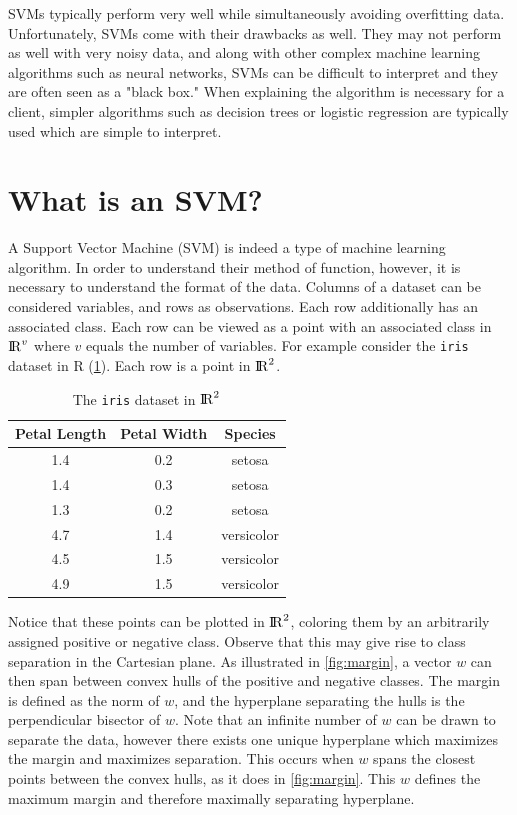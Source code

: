\documentclass[11pt]{article}
\theoremstyle{remark}	  \newtheorem*{remark}{Remark}
\numberwithin{equation}{section}
\begin{document}
SVMs typically perform very well while simultaneously avoiding overfitting data. Unfortunately, SVMs come with their drawbacks as well. They may not perform as well with very noisy data, and along with other complex machine learning algorithms such as neural networks, SVMs can be difficult to interpret and they are often seen as a "black box." When explaining the algorithm is necessary for a client, simpler algorithms such as decision trees or logistic regression are typically used which are simple to interpret.

\section{What is an SVM?}

A Support Vector Machine (SVM) is indeed a type of machine learning algorithm. In order to understand their method of function, however, it is necessary to understand the format of the data. Columns of a dataset can be considered variables, and rows as observations. Each row additionally has an associated class. Each row can be viewed as a point with an associated class in ${\rm I\!R}^{v}$ where $v$ equals the number of variables. For example consider the \texttt{iris} dataset in R (\ref{table:iris}). Each row is a point in ${\rm I\!R}^{2}$.

\begin{table}[h]
\centering
\begin{tabular}{c c | c}
Petal Length  & Petal Width & Species \\
\hline
1.4 & 0.2 & setosa  \\
1.4 & 0.3 & setosa  \\
1.3 & 0.2 & setosa  \\
4.7 & 1.4 & versicolor \\
4.5 & 1.5 & versicolor \\
4.9 & 1.5 & versicolor  \\
\end{tabular}
\caption{The \texttt{iris} dataset in ${\rm I\!R}^{2}$}
\label{table:iris}
\end{table}

Notice that these points can be plotted in ${\rm I\!R}^{2}$, coloring them by an arbitrarily assigned positive or negative class. Observe that this may give rise to class separation in the Cartesian plane. As illustrated in \ref{fig:margin}, a vector $w$ can then span between convex hulls of the positive and negative classes. The margin is defined as the norm of $w$, and the hyperplane separating the hulls is the perpendicular bisector of $w$. Note that an infinite number of $w$ can be drawn to separate the data, however there exists one unique hyperplane which maximizes the margin and maximizes separation. This occurs when $w$ spans the closest points between the convex hulls, as it does in \ref{fig:margin}. This $w$ defines the maximum margin and therefore maximally separating hyperplane.
\end{document}
